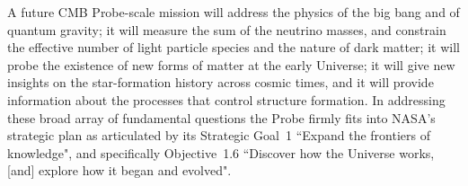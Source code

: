 A future \ac{CMB} Probe-scale mission will address the physics of the big bang and of quantum gravity; it will 
measure the sum of the neutrino masses, and constrain the effective number of light particle species and 
the nature of dark matter; it will probe the existence of new forms of matter at the early Universe; it will 
give new insights on the star-formation history across cosmic times, and it will provide information about 
the processes that control structure formation. In addressing these broad array of fundamental questions the 
Probe firmly fits into NASA's strategic plan as articulated by its Strategic Goal~1 ``Expand the frontiers of knowledge", 
and specifically Objective~1.6 ``Discover how the Universe works, [and] explore how it began and evolved".

